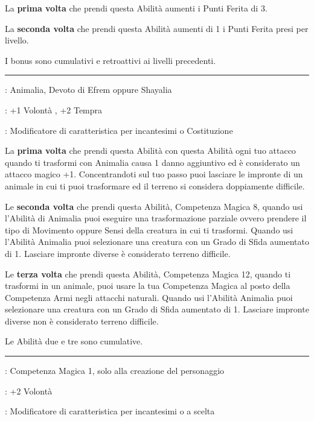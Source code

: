 \begin{multicols}{2}
La \textbf{prima volta} che prendi questa Abilità aumenti i Punti Ferita di 3.

La \textbf{seconda volta} che prendi questa Abilità aumenti di 1 i Punti Ferita presi per livello.

I bonus sono cumulativi e retroattivi ai livelli precedenti.

\smallskip\noindent\rule{\linewidth}{2pt} \hypertarget{Sangue Puro}{}\medskip{}
\noindent
\begin{description}[noitemsep, topsep=0pt, parsep=0pt, partopsep=0pt, leftmargin=0cm, labelwidth=2.5cm]
    \item[\textbf{Requisito}]: Animalia, Devoto di Efrem oppure Shayalia
    \item[\textbf{Tiri Salvezza}]: +1 Volontà , +2 Tempra
    \item[\textbf{Caratteristica}]: Modificatore di caratteristica per incantesimi o Costituzione
\end{description}

La \textbf{prima volta} che prendi questa Abilità con questa Abilità ogni tuo attacco quando ti trasformi con Animalia causa 1 danno aggiuntivo ed è considerato un attacco magico +1. Concentrandoti sul tuo passo puoi lasciare le impronte di un animale in cui ti puoi trasformare ed il terreno si considera doppiamente difficile.

Le \textbf{seconda volta} che prendi questa Abilità, Competenza Magica 8, quando usi l'Abilità di Animalia puoi eseguire una trasformazione parziale ovvero prendere il tipo di Movimento oppure Sensi della creatura in cui ti trasformi. Quando usi l'Abilità Animalia puoi selezionare una creatura con un Grado di Sfida aumentato di 1. Lasciare impronte diverse è considerato terreno difficile.

Le \textbf{terza volta} che prendi questa Abilità, Competenza Magica 12, quando ti trasformi in un animale, puoi usare la tua Competenza Magica al posto della Competenza Armi negli attacchi naturali. Quando usi l'Abilità Animalia puoi selezionare una creatura con un Grado di Sfida aumentato di 1. Lasciare impronte diverse non è considerato terreno difficile.

Le Abilità due e tre sono cumulative.

\smallskip\noindent\rule{\linewidth}{2pt} \hypertarget{Sapiente}{}\medskip{}
\noindent
\begin{description}[noitemsep, topsep=0pt, parsep=0pt, partopsep=0pt, leftmargin=0cm, labelwidth=2.5cm]
    \item[\textbf{Requisito}]: Competenza Magica 1, solo alla creazione del personaggio
    \item[\textbf{Tiri Salvezza}]: +2 Volontà
    \item[\textbf{Caratteristica}]: Modificatore di caratteristica per incantesimi o a scelta
\end{description}


\end{multicols}

